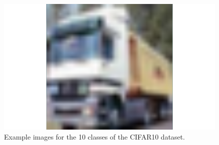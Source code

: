 \begin{figure}
\begin{minipage}{0.19\textwidth}
 \end{minipage}
 \begin{minipage}{0.19\textwidth}
  \includegraphics[width=1.5\textwidth]{../plots/cifar10-class9}
 \end{minipage}
 \caption{Example images for the 10 classes of the CIFAR10 dataset.}
\end{figure}
